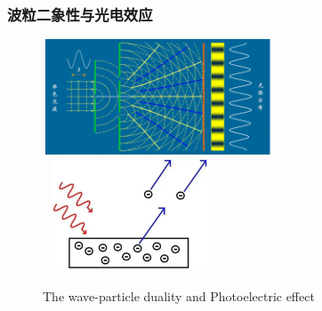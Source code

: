 \frame
{
	\frametitle{波粒二象性与光电效应}
\begin{figure}[h!]
\centering
\vspace{-15.5pt}
\includegraphics[height=1.35in,width=2.70in,viewport=0 0 536 280,clip]{Figures/wave-particle_duality.png}
\vskip 1pt
\includegraphics[height=1.32in,width=2.05in,viewport=0 0 620 455,clip]{Figures/Photoelectic_effect.png}
\caption{\textrm{The wave-particle duality and Photoelectric effect}}
\label{photo:wave_and_particle}
\end{figure}
}

